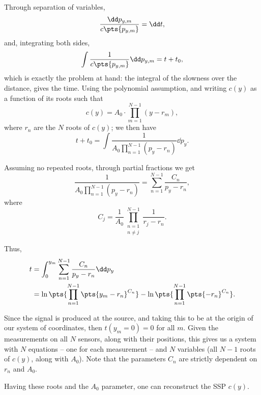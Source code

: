 Through separation of variables,
\begin{equation}
	\frac{\dd p_{y,m}}{c\pts{p_{y,m}}} = \dd t,
\end{equation}
and, integrating both sides,
\begin{equation}
	\int \frac{1}{c\pts{p_{y,m}}} \dd p_{y,m} = t + t_0,
\end{equation}
which is exactly the problem at hand: the integral of the slowness over the distance, gives the time. Using the polynomial assumption, and writing $c(y)$ as a function of its roots such that
\begin{equation}
	c(y) = A_0 \cdot \prod_{m=1}^{N-1} (y - r_m),
\end{equation}
where $r_n$ are the $N$ roots of $c(y)$; we then have
\begin{equation}
	t + t_0 = \int \frac{1}{A_0 \prod_{n=1}^{N-1} (p_y-r_n)} \dd p_y .
\end{equation}

Assuming no repeated roots, through partial fractions we get
\begin{equation}
	\frac{1}{A_0 \prod_{n=1}^{N-1} (p_y-r_n)} = \sum_{n=1}^{N-1} \frac {C_n}{p_y - r_n},
\end{equation}
where
\begin{equation}
	C_j = \frac{1}{A_0} \prod_{\substack{n=1\\n\neq j}}^{N-1} \frac{1}{r_j - r_n}.
\end{equation}

Thus,
\begin{equation}
	\begin{split}t 
		& = \int_{0}^{y_m} \sum_{n=1}^{N-1} \frac{C_n}{p_y - r_n} \dd p_y \\
		& = \ln\pts{\prod_{n=1}^{N-1} \pts{y_m - r_n} ^{C_n}} - \ln\pts{\prod_{n=1}^{N-1} \pts{-r_n} ^{C_n}}.
	\end{split}
\end{equation}

Since the signal is produced at the source, and taking this to be at the origin of our system of coordinates, then $t(y_m=0) = 0$ for all $m$. Given the measurements on all $N$ sensors, along with their positions, this gives us a system with $N$ equations -- one for each measurement -- and $N$ variables (all $N-1$ roots of $c(y)$, along with $A_0$). Note that the parameters $C_n$ are strictly dependent on $r_n$ and $A_0$.

Having these roots and the $A_0$ parameter, one can reconstruct the SSP $c(y)$.

